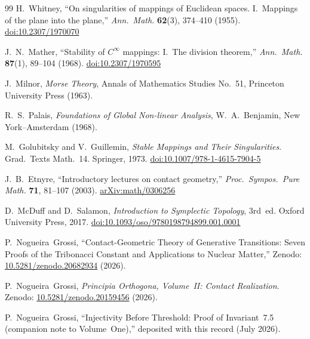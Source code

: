\documentclass[14pt,a4paper]{extarticle}
\begin{document}
\begin{thebibliography}{99}
H.~Whitney,
``On singularities of mappings of Euclidean spaces. I.\ Mappings of the plane into the plane,''
\textit{Ann.\ Math.} \textbf{62}(3), 374--410 (1955).
\href{https://doi.org/10.2307/1970070}{doi:10.2307/1970070}

J.~N.~Mather,
``Stability of $C^\infty$ mappings: I.\ The division theorem,''
\textit{Ann.\ Math.} \textbf{87}(1), 89--104 (1968).
\href{https://doi.org/10.2307/1970595}{doi:10.2307/1970595}

J.~Milnor,
\textit{Morse Theory},
Annals of Mathematics Studies No.~51, Princeton University Press (1963).

R.~S.~Palais,
\textit{Foundations of Global Non-linear Analysis},
W.~A.~Benjamin, New York--Amsterdam (1968).

M.~Golubitsky and V.~Guillemin,
\textit{Stable Mappings and Their Singularities}.
Grad.\ Texts Math.~14. Springer, 1973.
\href{https://doi.org/10.1007/978-1-4615-7904-5}{doi:10.1007/978-1-4615-7904-5}

J.~B.~Etnyre,
``Introductory lectures on contact geometry,''
\textit{Proc.\ Sympos.\ Pure Math.} \textbf{71}, 81--107 (2003).
\href{https://arxiv.org/abs/math/0306256}{arXiv:math/0306256}

D.~McDuff and D.~Salamon,
\textit{Introduction to Symplectic Topology}, 3rd~ed.
Oxford University Press, 2017.
\href{https://doi.org/10.1093/oso/9780198794899.001.0001}{doi:10.1093/oso/9780198794899.001.0001}

P.~Nogueira~Grossi,
``Contact-Geometric Theory of Generative Transitions: Seven Proofs of
the Tribonacci Constant and Applications to Nuclear Matter,''
Zenodo: \href{https://doi.org/10.5281/zenodo.20682934}{10.5281/zenodo.20682934} (2026).

P.~Nogueira~Grossi,
\textit{Principia Orthogona, Volume~II: Contact Realization}.
Zenodo: \href{https://doi.org/10.5281/zenodo.20159456}{10.5281/zenodo.20159456} (2026).

P.~Nogueira~Grossi,
``Injectivity Before Threshold: Proof of Invariant~7.5
(companion note to Volume~One),''
deposited with this record (July 2026).

\end{thebibliography}
\end{document}
